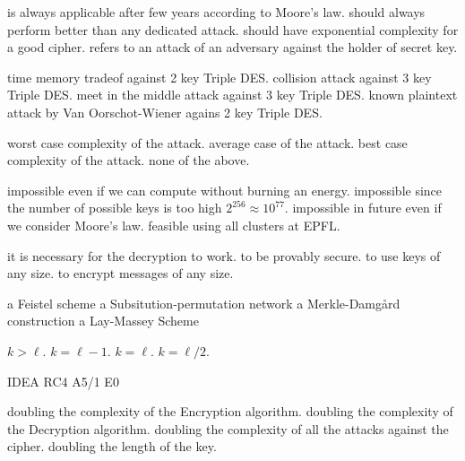 {is always applicable after few years according to Moore's law.}
{should always perform better than any dedicated attack.}
{should have exponential complexity for a good cipher.}
{refers to an attack of an adversary against the holder of secret key.}

{time memory tradeof against 2 key Triple DES.}
{collision attack against 3 key Triple DES.}
{meet in the middle attack against 3 key Triple DES.}
{known plaintext attack by Van Oorschot-Wiener agains 2 key Triple DES.}

{worst case complexity of the attack.}
{average case of the attack.}
{best case complexity of the attack.}
{none of the above.}

{impossible even if we can compute without burning an energy.}
{impossible since the number of possible keys is too high $2^{256} \approx 10^{77}$.}
{impossible in future even if we consider Moore's law.}
{feasible using all clusters at EPFL.}

 {it is necessary for the decryption to work.}
 {to be provably secure.}
 {to use keys of any size.}
 {to encrypt messages of any size.}
 
 {a Feistel scheme}%
 {a Subsitution-permutation network}%
 {a Merkle-Damg{\aa}rd construction}%
 {a Lay-Massey Scheme}%
 

 {$k > \ell$.}
 {$k=\ell-1$.}
 {$k=\ell$.}
 {$k=\ell/2$.}

 {IDEA}%
 {RC4}%
 {A5/1}%
 {E0}%
 
{doubling the complexity of the Encryption algorithm.}
{doubling the complexity of the Decryption algorithm.}
{doubling the complexity of all the attacks against the cipher.}
{doubling the length of the key.}

